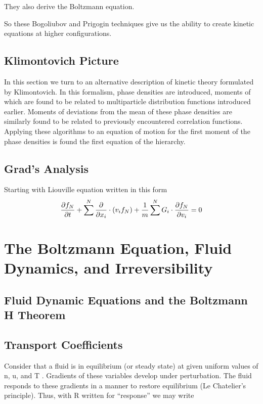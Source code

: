 They also derive the Boltzmann equation.

So these Bogoliubov and Prigogin techniques give us the ability to create kinetic equations at higher configurations.

\subsection{Klimontovich Picture}

In this section we turn to an alternative description of kinetic theory formulated by Klimontovich. In this formalism, phase densities are introduced, moments of which are found to be related to multiparticle distribution functions introduced earlier. Moments of deviations from the mean of these phase densities are similarly found to be related to previously encountered correlation functions. Applying these algorithms to an equation of motion for the first moment of the phase densities is found the first equation of the hierarchy.

\subsection{Grad's Analysis}

Starting with Liouville equation written in this form
\[
\pdv{f_N}{t} + \sum^N \pdv{}{x_i} \cdot (v_i f_N) + \frac{1}{m} \sum^N G_i \cdot \pdv{f_N}{v_i} = 0
  \]

  \section{The Boltzmann Equation, Fluid
Dynamics, and Irreversibility}

\subsection{Fluid Dynamic Equations and the Boltzmann H
Theorem}

\subsection{Transport Coefficients}


Consider that a fluid is in equilibrium (or steady state) at given uniform values of
n, u, and T . Gradients of these variables develop under perturbation. The fluid
responds to these gradients in a manner to restore equilibrium (Le Chatelier’s
principle). Thus, with R written for “response” we may write


